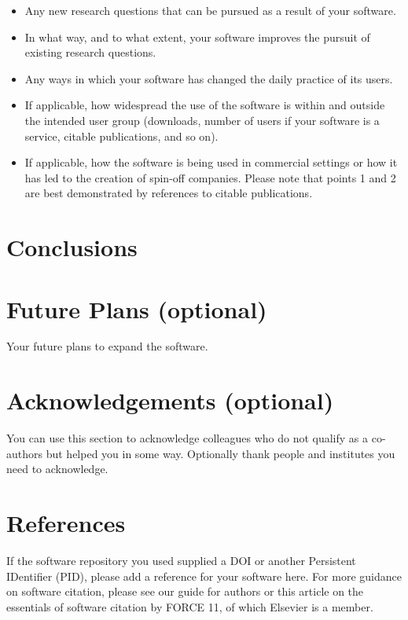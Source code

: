 \documentclass[preprint,12pt, a4paper]{elsarticle}
\begin{document}
\begin{itemize}
  \item Any new research questions that can be pursued as a result of your
      software.

  \item In what way, and to what extent, your software improves the pursuit
      of existing research questions.

  \item Any ways in which your software has changed the daily practice of
      its users.

  \item If applicable, how widespread the use of the software is within and
      outside the intended user group (downloads, number of users if your
      software is a service, citable publications, and so on).

  \item If applicable, how the software is being used in commercial
      settings or how it has led to the creation of spin-off companies.
      Please note that points 1 and 2 are best demonstrated by references
      to citable publications. \end{itemize}

\section{Conclusions}

\section{Future Plans (optional)}
Your future plans to expand the software.


\section*{Acknowledgements (optional)}
\label{}

You can use this section to acknowledge colleagues who do not qualify as a
co-authors but helped you in some way. Optionally thank people and institutes
you need to acknowledge.

\section*{References}

If the software repository you used supplied a DOI or another Persistent
IDentifier (PID), please add a reference for your software here. For more
guidance on software citation, please see our guide for authors or this
article on the essentials of software citation by FORCE 11, of which Elsevier
is a member.



%
%
%
\end{document}
